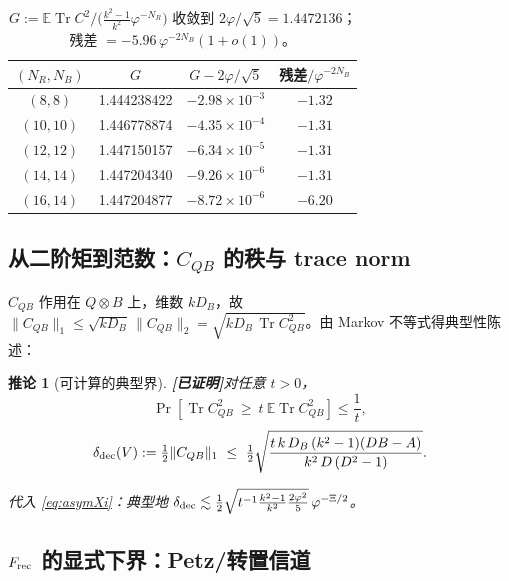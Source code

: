 \documentclass[11pt,a4paper]{ctexart}
\newtheorem{corollary}{推论}
\theoremstyle{definition}
\newcommand{\proved}{\textcolor{green!45!black}{\textbf{[已证明]}}}
\newcommand{\Tr}{\operatorname{Tr}}
\newcommand{\E}{\mathbb{E}}
\newcommand{\ph}{\varphi}
\begin{document}
\begin{table}[t]\centering
\caption{$G:=\E\Tr C^2\big/\big(\frac{k^2-1}{k^2}\ph^{-N_R}\big)$ 收敛到 $2\ph/\sqrt5=1.4472136$；残差 $=-5.96\,\ph^{-2N_B}(1+o(1))$。}
\label{tab:G}
\begin{tabular}{cccc}
\toprule
$(N_R,N_B)$ & $G$ & $G-2\ph/\sqrt5$ & 残差$/\ph^{-2N_B}$\\
\midrule
$(8,8)$ & 1.444238422 & $-2.98\times10^{-3}$ & $-1.32$\\
$(10,10)$ & 1.446778874 & $-4.35\times10^{-4}$ & $-1.31$\\
$(12,12)$ & 1.447150157 & $-6.34\times10^{-5}$ & $-1.31$\\
$(14,14)$ & 1.447204340 & $-9.26\times10^{-6}$ & $-1.31$\\
$(16,14)$ & 1.447204877 & $-8.72\times10^{-6}$ & $-6.20$\\
\bottomrule
\end{tabular}
\end{table}

\subsection{从二阶矩到范数：$C_{QB}$ 的秩与 trace norm}

$C_{QB}$ 作用在 $Q\otimes B$ 上，维数 $kD_B$，故 $\|C_{QB}\|_1\le\sqrt{kD_B}\,\|C_{QB}\|_2=\sqrt{kD_B\,\Tr C_{QB}^2}$。由 Markov 不等式得典型性陈述：
\begin{corollary}[可计算的典型界]\proved{}\label{cor:markov}
对任意 $t>0$，
\[
\Pr\!\left[\Tr C_{QB}^2\ \ge\ t\ \E\Tr C_{QB}^2\right]\le\frac1t,
\]
\[
\delta_{\rm dec}(V):=\tfrac12\|C_{QB}\|_1\ \le\ \tfrac12\sqrt{\frac{t\,k\,D_B\,(k^2-1)(DB-A)}{k^2\,D\,(D^2-1)}} .
\]

代入 \eqref{eq:asymXi}：典型地 $\delta_{\rm dec}\lesssim \tfrac12\sqrt{t^{-1}\frac{k^2-1}{k^2}\frac{2\ph^2}{5}}\,\ph^{-\Xi/2}$。
\end{corollary}

\subsection{$F_{\rm rec}$ 的显式下界：Petz/转置信道}
\end{document}
